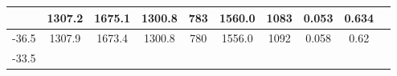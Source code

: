 \documentclass[a4paper,12pt]{article}
\begin{document}
\begin{longtable}{
     |
%    
    c|
%    
    c|
%    
    c|
%    
    c|
%    
    c|
%    
    c|
%    
    c|
%    
    c|
%    
    c|
%    
    c|
%    
    }
%        
        & 1307.2
%        

%        

%        
        & 1675.1
%        

%        

%        
        & 1300.8
%        

%        

%        
        & 783
%        

%        

%        
        & 1560.0
%        

%        

%        
        & 1083
%        

%        

%        
        & 0.053
%        

%        

%        
        & 0.634
%        

%        
        \\
        \hline

        

%        

%        
        -36.5
%        

%        

%        
        & 1307.9
%        

%        

%        
        & 1673.4
%        

%        

%        
        & 1300.8
%        

%        

%        
        & 780
%        

%        

%        
        & 1556.0
%        

%        

%        
        & 1092
%        

%        

%        
        & 0.058
%        

%        

%        
        & 0.62
%        

%        
        \\
        \hline

        

%        

%        
        -33.5
%        

%        


\end{longtable}
\end{document}
